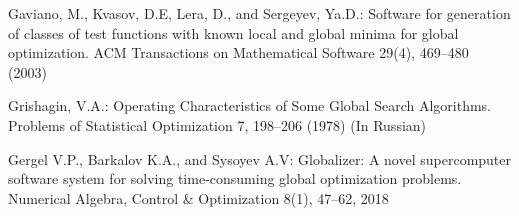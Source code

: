 \documentclass[runningheads]{llncs}
\begin{document}
\begin{thebibliography}{107}
Gaviano, M., Kvasov, D.E, Lera, D., and Sergeyev, Ya.D.: Software for generation of classes of test functions with known local and global minima for global optimization. ACM Transactions on Mathematical Software 29(4), 469--480 (2003)

Grishagin, V.A.: Operating Characteristics of Some Global Search Algorithms. Problems of Statistical Optimization 7, 198--206 (1978) (In Russian)

Gergel V.P., Barkalov K.A., and Sysoyev A.V: Globalizer: A novel supercomputer software system for solving time-consuming global optimization problems. Numerical Algebra, Control \& Optimization 8(1), 47--62, 2018

\end{thebibliography}
\end{document}
